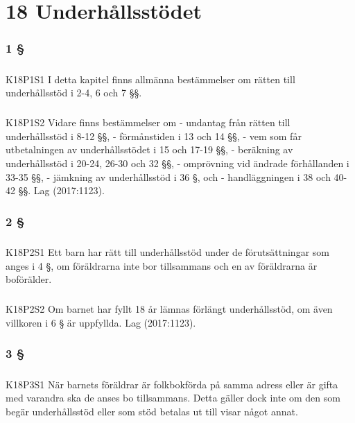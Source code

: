 \documentclass[a4paper,notitlepage,openany,10pt]{book}
\begin{document}
\chapter*{18 Underhållsstödet}
\subsection*{1 §}
\paragraph*{}
{\tiny K18P1S1}
I detta kapitel finns allmänna bestämmelser om rätten till underhållsstöd i 2-4, 6 och 7 §§.
\paragraph*{}
{\tiny K18P1S2}
Vidare finns bestämmelser om
\newline - undantag från rätten till underhållsstöd i 8-12 §§,
\newline - förmånstiden i 13 och 14 §§,
\newline - vem som får utbetalningen av underhållsstödet i 15 och 17-19 §§,
\newline - beräkning av underhållsstöd i 20-24, 26-30 och 32 §§,
\newline - omprövning vid ändrade förhållanden i 33-35 §§,
\newline - jämkning av underhållsstöd i 36 §, och
\newline - handläggningen i 38 och 40-42 §§.
Lag (2017:1123).
\subsection*{2 §}
\paragraph*{}
{\tiny K18P2S1}
Ett barn har rätt till underhållsstöd under de förutsättningar som anges i 4 §, om föräldrarna inte bor tillsammans och en av föräldrarna är boförälder.
\paragraph*{}
{\tiny K18P2S2}
Om barnet har fyllt 18 år lämnas förlängt underhållsstöd, om även villkoren i 6 § är uppfyllda.
Lag (2017:1123).
\subsection*{3 §}
\paragraph*{}
{\tiny K18P3S1}
När barnets föräldrar är folkbokförda på samma adress eller är gifta med varandra ska de anses bo tillsammans.
Detta gäller dock inte om den som begär underhållsstöd eller som stöd betalas ut till visar något annat.
\end{document}
